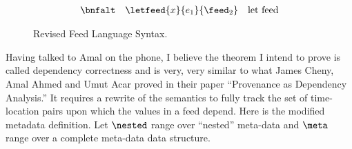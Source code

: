 \begin{figure}[t]
\[\begin{array}{lll}
 \bnfalt & \letfeed{x}{e_1}{\feed_2} & \mbox{let feed} \\
\end{array}
\]
\caption{Revised Feed Language Syntax.}
\label{fig:syntax-revised}
\end{figure}

Having talked to Amal on
the phone, I believe the theorem I intend to prove 
is called dependency correctness and
is very, very similar to what James Cheny, Amal Ahmed and Umut Acar
proved in their paper ``Provenance as Dependency Analysis.''
It requires a rewrite of the semantics to fully track the set of time-location
pairs upon which the values in a feed depend. Here is the modified metadata 
definition.  Let $\nested$ range over ``nested'' meta-data and $\meta$ range over
a complete meta-data data structure.

